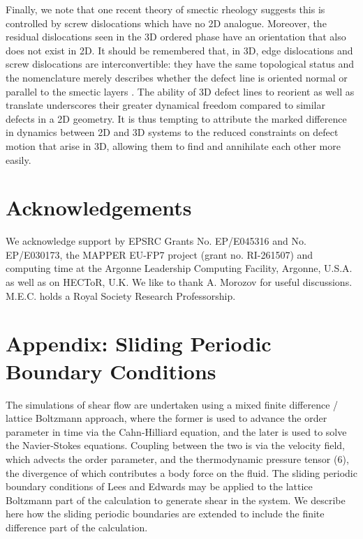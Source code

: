 \documentclass[8.5pt,twoside,twocolumn]{article}
\begin{document}
Finally, we note that one recent theory of smectic rheology \cite{Lu08} suggests this is controlled by screw dislocations which have no 2D analogue. Moreover, the residual dislocations seen in the 3D ordered phase have an orientation that also does not exist in 2D. It should be remembered that, in 3D, edge dislocations and screw dislocations are interconvertible: they have the same topological status and the nomenclature merely describes whether the defect line is oriented normal or parallel to the smectic layers \cite{ChaikinLubensky}. The ability of 3D defect lines to reorient as well as translate underscores their greater dynamical freedom compared to similar defects in a 2D geometry. It is thus tempting to attribute the marked difference in dynamics between 2D and 3D systems to the reduced constraints on defect motion that arise in 3D, allowing them to find and annihilate each other more easily.



\section{Acknowledgements}
We acknowledge support by EPSRC Grants No. EP/E045316 and No. EP/E030173, the MAPPER EU-FP7 project (grant no. RI-261507) and computing time at the Argonne Leadership Computing Facility, Argonne, U.S.A. as well as on HECToR, U.K.
We like to thank A. Morozov for useful discussions. 
M.E.C. holds a Royal Society Research Professorship.

\section{Appendix: Sliding Periodic Boundary Conditions}

The simulations of shear flow are undertaken using a mixed finite
difference / lattice Boltzmann approach, where the former is used
to advance the order parameter in time via the Cahn-Hilliard equation,
and the later is used to solve the Navier-Stokes equations.
Coupling between the two is
via the velocity field, which advects the order parameter, and
the thermodynamic pressure tensor (6), the divergence of which
contributes a body force on the fluid. The sliding periodic
boundary conditions of Lees and Edwards\cite{leesedwards} may be
applied to the lattice Boltzmann part of the calculation
\cite{Wagner02,Adhikari05} to generate shear in the system. We
describe here how the sliding periodic boundaries are extended to
include the finite difference part of the calculation.
\end{document}
